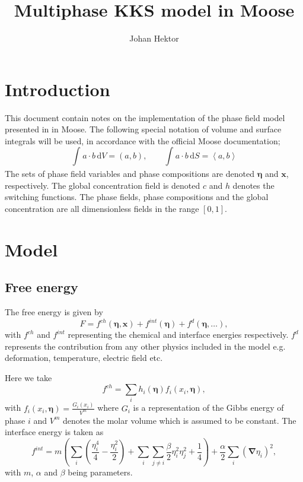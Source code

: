 \documentclass[12pt,a4paper]{article}
\providecommand{\vbf}[1]{\boldsymbol{#1}}
\providecommand{\gradient}[0]{\vbf{\nabla}}
\providecommand{\inte}[4]{\int_{#1}^{#2}{#3}\,\mathrm{d}{#4}}
\providecommand{\vint}[2]{\left(#1,#2\right)}
\providecommand{\sint}[2]{\left<#1,#2\right>}
\begin{document}
\title{Multiphase KKS model in Moose}
\author{Johan Hektor}
\maketitle

\section{Introduction}
This document contain notes on the implementation of the phase field model presented in \cite{hektor2016coupled} in Moose.
The following special notation of volume and surface integrals will be used, in accordance with the official Moose documentation;
\begin{equation}
  \inte{}{}{a\cdot b}{V}=\vint{a}{b}, \qquad \inte{}{}{a\cdot b}{S}=\sint{a}{b}
\end{equation}
The sets of phase field variables and phase compositions are denoted $\vbf{\eta}$ and $\vbf{x}$, respectively. 
The global concentration field is denoted $c$ and $h$ denotes the switching functions.
The phase fields, phase compositions and the global concentration are all dimensionless fields in the range $[0,1]$.

\section{Model}

\subsection{Free energy}
The free energy is given by
\begin{equation}
  F = f^{ch}(\vbf{\eta},\vbf{x})+f^{int}(\vbf{\eta})+f^d(\vbf{\eta},\dots) ,
  \label{eq:F}
\end{equation}
with $f^{ch}$ and $f^{int}$ representing the chemical and interface energies respectively. 
$f^d$ represents the contribution from any other physics included in the model e.g. deformation, temperature, electric field etc.

Here we take
\begin{equation}
  f^{ch}=\sum_ih_i(\vbf{\eta})f_i(x_i,\vbf{\eta}),
  \label{eq:fch}
\end{equation}
with $f_i(x_i,\vbf{\eta})=\frac{G_i(x_i)}{V^m}$ where $G_i$ is a representation of the Gibbs energy of phase $i$ and $V^m$ denotes the molar volume which is assumed to be constant.
The interface energy is taken as
\begin{equation}
  f^{int}=m\left(\sum_i\left(\frac{\eta_i^4}{4}-\frac{\eta_i^2}{2}\right)+\sum_i\sum_{j\ne i}\frac{\beta}{2}\eta_i^2\eta_j^2+\frac{1}{4}\right)+\frac{\alpha}{2}\sum_i\left(\gradient\eta_i\right)^2,
  \label{eq:fint}
\end{equation}
with $m$, $\alpha$ and $\beta$ being parameters.
\end{document}
